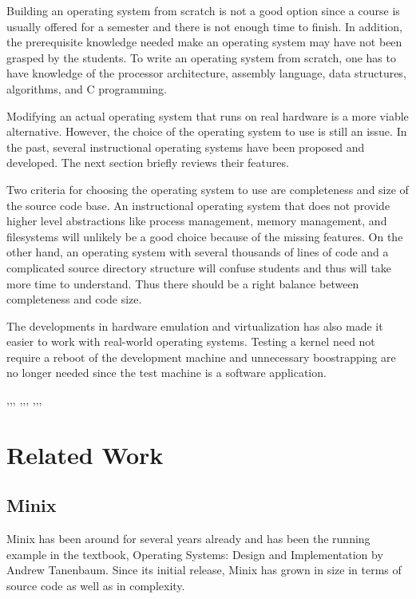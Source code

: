 \documentclass{acm_proc_article-sp}
\begin{document}
Building an operating system from scratch is not a good option since a course
is usually offered for a semester and there is not enough time to finish. In 
addition, the prerequisite knowledge needed make an operating system may have
not been grasped by the students. To write an operating system from scratch, 
one has to have knowledge of the processor architecture, assembly language, 
data structures, algorithms, and C programming.

Modifying an actual operating system that runs on real hardware is a more
viable alternative. However, the choice of the operating system to use is
still an issue. In the past, several instructional operating systems have been
proposed and developed. The next section briefly reviews their features.

Two criteria for choosing the operating system to use are completeness 
and size of the source code base. An instructional operating system that does
not provide higher level abstractions like process management, 
memory management, and filesystems will unlikely be a good choice because
of the missing features. On the other hand, an operating system with several 
thousands of lines of code and a complicated source directory structure will
confuse students and thus will take more time to understand. Thus there should
be a right balance between completeness and code size.

The developments in hardware emulation and virtualization has also made it 
easier to work with real-world operating systems. Testing a kernel need not
require a reboot of the development machine and unnecessary boostrapping are
no longer needed since the test machine is a software application.
 


\cite{silberschatz:osc},\cite{tanenbaum:osdai},\cite{dayo:dexos},
\cite{claypool:fossil},\cite{christopher:nachos},\cite{gary:nachos},
\cite{tanenbaum:minix},\cite{black:osfs},\cite{hovemeyer:geekos},
\cite{anderson:survey}


\section{Related Work}

\subsection{Minix}
Minix has been around for several years already and has been the running 
example in the textbook, Operating Systems: Design and Implementation by 
Andrew Tanenbaum. Since its initial release, Minix has grown in size in terms
of source code as well as in complexity. 
\end{document}
